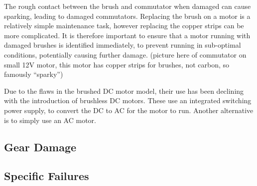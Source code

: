 The rough contact between the brush and commutator when damaged can cause sparking, leading to damaged commutators. Replacing the brush on a motor is a relatively simple maintenance task, however replacing the copper strips can be more complicated. It is therefore important to ensure that a motor running with damaged brushes is identified immediately, to prevent running in sub-optimal conditions, potentially causing further damage. (picture here of commutator on small 12V motor, this motor has copper strips for brushes, not carbon, so famously “sparky”)

Due to the flaws in the brushed DC motor model, their use has been declining with the introduction of brushless DC motors. These use an integrated switching power supply, to convert the DC to AC for the motor to run. Another alternative is to simply use an AC motor. 

\subsection{Gear Damage}


\subsection{Specific Failures}

